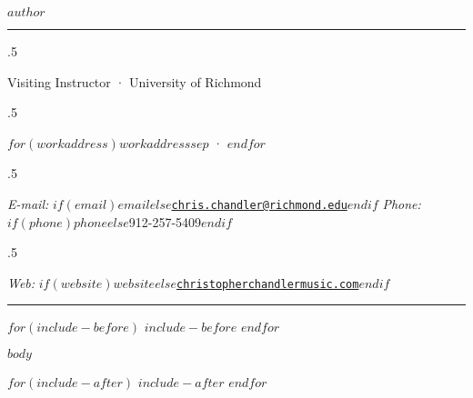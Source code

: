 \documentclass[plain, titleabove]{simplecv}
\begin{document}
\thispagestyle{empty} 		%

\centerline{\Large \textsc{$author$}}

%

\vspace{2 mm}

\hrule

\vspace{2 mm}

\moveleft.5\hoffset\centerline{Visiting Instructor · University of Richmond}
\moveleft.5\hoffset\centerline{$for(workaddress)$$workaddress$$sep$ · $endfor$}
\moveleft.5\hoffset\centerline{
	\emph{E-mail:} \href{mailto:}{\tt $if(email)$$email$$else$chris.chandler@richmond.edu$endif$}
	\hspace{1 mm}
	\emph{Phone:} $if(phone)$$phone$$else$912-257-5409$endif$}
\moveleft.5\hoffset\centerline{
	\emph{Web:} $if(website)$\href{$website$}{\tt $website$}$else$\href{http://christopherchandlermusic.com}{\tt christopherchandlermusic.com}$endif$}

\vspace{2 mm}

\hrule

$for(include-before)$
	$include-before$
$endfor$

$body$

$for(include-after)$
	$include-after$
$endfor$
\end{document}
